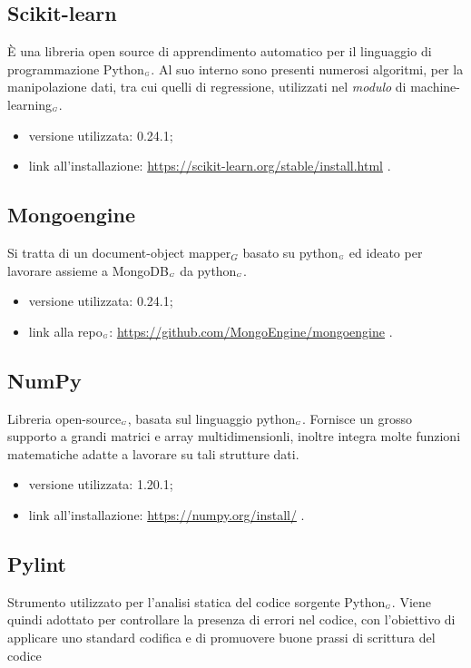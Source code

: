 \subsection{Scikit-learn}\label{LibrerieScikitLearn}
È una libreria open source di apprendimento automatico per il linguaggio di programmazione Python$_{\scaleto{G}{3pt}}$.
Al suo interno sono presenti numerosi algoritmi, per la manipolazione dati, tra cui quelli di regressione, utilizzati nel \textit{modulo} di machine-learning$_{\scaleto{G}{3pt}}$.

\begin{itemize}
  \item versione utilizzata: 0.24.1;
  \item link all'installazione: \url{https://scikit-learn.org/stable/install.html} .
\end{itemize}

\subsection{Mongoengine}\label{LibrerieMongoengine}
Si tratta di un document-object mapper$_G$ basato su python$_{\scaleto{G}{3pt}}$ ed ideato per lavorare assieme a MongoDB$_{\scaleto{G}{3pt}}$ da python$_{\scaleto{G}{3pt}}$.

\begin{itemize}
  \item versione utilizzata: 0.24.1;
  \item link alla repo$_{\scaleto{G}{3pt}}$: \url{https://github.com/MongoEngine/mongoengine} .
\end{itemize}

\subsection{NumPy}\label{LibrerieNumpy}
Libreria open-source$_{\scaleto{G}{3pt}}$, basata sul linguaggio python$_{\scaleto{G}{3pt}}$.
Fornisce un grosso supporto a grandi matrici e array multidimensionli, inoltre integra molte funzioni matematiche adatte a lavorare su tali strutture dati.

\begin{itemize}
  \item versione utilizzata: 1.20.1;
  \item link all'installazione: \url{https://numpy.org/install/} .
\end{itemize}

\subsection{Pylint}\label{LibreriePylint}
Strumento utilizzato per l’analisi statica del codice sorgente Python$_{\scaleto{G}{3pt}}$. Viene quindi adottato per controllare la presenza di errori nel codice, con l’obiettivo di applicare uno standard codifica e di promuovere buone prassi di scrittura del codice

